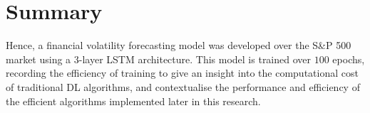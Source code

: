 \documentclass[a4paper, 11pt]{report}
\begin{document}



    \section{Summary}

    Hence, a financial volatility forecasting model was developed over the S\&P 500 market using a 3-layer LSTM architecture. This model is trained over $100$ epochs, recording the efficiency of training to give an insight into the computational cost of traditional DL algorithms, and contextualise the performance and efficiency of the efficient algorithms implemented later in this research.
\end{document}
